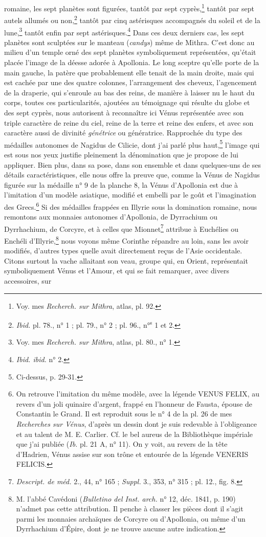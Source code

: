\documentclass{article}
\begin{document}
romaine, les sept planètes sont figurées, tantôt par sept cyprès,\footnote{Voy. mes \emph{Recherch. sur Mithra}, atlas, pl. 92.} tantôt par sept autels allumés ou non,\footnote{\emph{Ibid.} pl. 78., n° 1 ; pl. 79., n° 2 ; pl. 96., n°\textsuperscript{s} 1 et 2.} tantôt par cinq astérisques accompagnés du soleil et de la lune,\footnote{Voy. mes \emph{Recherch. sur Mithra}, atlas, pl. 80., n° 1.} tantôt enfin par sept astérisques.\footnote{\emph{Ibid. ibid.} n° 2.} Dans ces deux derniers cas, les sept planètes sont sculptées sur le manteau (\emph{candys}) même de Mithra. C'est donc au milieu d'un temple orné des sept planètes symboliquement représentées, qu'était placée l'image de la déesse adorée à Apollonia. Le long sceptre qu'elle porte de la main gauche, la patère que probablement elle tenait de la main droite, mais qui est cachée par une des quatre colonnes, l'arrangement des cheveux, l'agencement de la draperie, qui s'enroule au bas des reins, de manière à laisser nu le haut du corps, toutes ces particularités, ajoutées au témoignage qui résulte du globe et des sept cyprès, nous autorisent à reconnaître ici Vénus représentée avec son triple caractère de reine du ciel, reine de la terre et reine des enfers, et avec son caractère aussi de divinité \emph{génétrice} ou génératrice. Rapprochée du type des médailles autonomes de Nagidus de Cilicie, dont j'ai parlé plus haut,\footnote{Ci-dessus, p. 29-31.} l'image qui est sous nos yeux justifie pleinement la dénomination que je propose de lui appliquer. Bien plus, dans sa pose, dans son ensemble et dans quelques-uns de ses détails caractéristiques, elle nous offre la preuve que, comme la Vénus de Nagidus figurée sur la médaille n° 9 de la planche 8, la Vénus d'Apollonia est due à l'imitation d'un modèle asiatique, modifié et embelli par le goût et l'imagination des Grecs.\footnote{On retrouve l'imitation du même modèle, avec la légende VENUS FELIX, au revers d'un joli quinaire d'argent, frappé en l'honneur de Fausta, épouse de Constantin le Grand. Il est reproduit sous le n° 4 de la pl. 26 de mes \emph{Recherches sur Vénus}, d'après un dessin dont je suis redevable à l'obligeance et au talent de M. E. Carlier. Cf. le bel aureus de la Bibliothèque impériale que j'ai publiée (\emph{Ib.} pl. 21 A, n° 11). On y voit, au revers de la tête d'Hadrien, Vénus assise sur son trône et entourée de la légende VENERIS FELICIS.} Si des médailles frappées en Illyrie sous la domination romaine, nous remontons aux monnaies autonomes d'Apollonia, de Dyrrachium ou Dyrrhachium, de Corcyre, et à celles que Mionnet\footnote{\emph{Descript. de méd.} 2., 44, n° 165 ; \emph{Suppl.} 3., 353, n° 315 ; pl. 12., fig. 8.} attribue à Euchélies ou Enchéli d'Illyrie,\footnote{M. l'abbé Cavédoni (\emph{Bulletino del Inst. arch.} n° 12, déc. 1841, p. 190) n'admet pas cette attribution. Il penche à classer les pièces dont il s'agit parmi les monnaies archaïques de Corcyre ou d'Apollonia, ou même d'un Dyrrhachium d'Épire, dont je ne trouve aucune autre indication.} nous voyons même Corinthe répandre au loin, sans les avoir modifiés, d'autres types quelle avait directement reçus de l'Asie occidentale. Citons surtout la vache allaitant son veau, groupe qui, en Orient, représentait symboliquement Vénus et l'Amour, et qui se fait remarquer, avec divers accessoires, sur 
\end{document}

